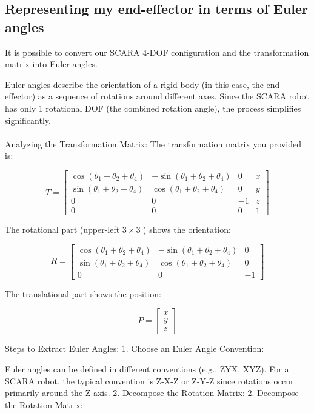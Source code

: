 \documentclass[12pt]{report}
\begin{document}
	
	\subsection{Representing my end-effector in terms of Euler angles}
It is possible to convert our SCARA 4-DOF configuration and the transformation matrix into Euler angles.

Euler angles describe the orientation of a rigid body (in this case, the end-effector) as a sequence of rotations around different axes. Since the SCARA robot has only 1 rotational DOF (the combined rotation angle), the process simplifies significantly.
\\\\Analyzing the Transformation Matrix:\newline
The transformation matrix you provided is:

$$
T=\left[\begin{array}{cccc}
	\cos \left(\theta_1+\theta_2+\theta_4\right) & -\sin \left(\theta_1+\theta_2+\theta_4\right) & 0 & x \\
	\sin \left(\theta_1+\theta_2+\theta_4\right) & \cos \left(\theta_1+\theta_2+\theta_4\right) & 0 & y \\
	0 & 0 & -1 & z \\
	0 & 0 & 0 & 1
\end{array}\right]
$$

The rotational part (upper-left $3 \times 3$ ) shows the orientation:

$$
R=\left[\begin{array}{ccc}
	\cos \left(\theta_1+\theta_2+\theta_4\right) & -\sin \left(\theta_1+\theta_2+\theta_4\right) & 0 \\
	\sin \left(\theta_1+\theta_2+\theta_4\right) & \cos \left(\theta_1+\theta_2+\theta_4\right) & 0 \\
	0 & 0 & -1
\end{array}\right]
$$

The translational part shows the position:

$$
P=\left[\begin{array}{l}
	x \\
	y \\
	z
\end{array}\right]
$$


Steps to Extract Euler Angles:
1. Choose an Euler Angle Convention:

Euler angles can be defined in different conventions (e.g., ZYX, XYZ). For a SCARA robot, the typical convention is Z-X-Z or Z-Y-Z since rotations occur primarily around the Z-axis.
2. Decompose the Rotation Matrix:
2. Decompose the Rotation Matrix:
\end{document}
